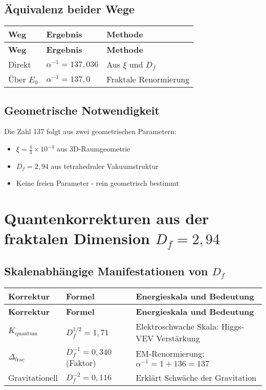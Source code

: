 \documentclass[12pt,a4paper]{article}
\begin{document}
	\subsection{Äquivalenz beider Wege}
	
	\begin{longtable}{|p{3cm}|p{3cm}|p{5cm}|}
		\hline
		\textbf{Weg} & \textbf{Ergebnis} & \textbf{Methode} \\
		\hline
		\endfirsthead
		\hline
		\textbf{Weg} & \textbf{Ergebnis} & \textbf{Methode} \\
		\hline
		\endhead
		Direkt & \(\alpha^{-1} = 137{,}036\) & Aus \(\xi\) und \(D_f\) \\
		\hline
		Über \(E_0\) & \(\alpha^{-1} = 137{,}0\) & Fraktale Renormierung \\
		\hline
	\end{longtable}
	
	\subsection{Geometrische Notwendigkeit}
	
	Die Zahl 137 folgt aus zwei geometrischen Parametern:
	\begin{itemize}
		\item \(\xi = \frac{4}{3} \times 10^{-4}\) aus 3D-Raumgeometrie
		\item \(D_f = 2{,}94\) aus tetrahedraler Vakuumstruktur
		\item Keine freien Parameter - rein geometrisch bestimmt
	\end{itemize}
	
	\section{Quantenkorrekturen aus der fraktalen Dimension \(D_f = 2{,}94\)}
	
	\subsection{Skalenabhängige Manifestationen von \(D_f\)}
	
	\begin{longtable}{|p{4cm}|p{3cm}|p{6cm}|}
		\hline
		\textbf{Korrektur} & \textbf{Formel} & \textbf{Energieskala und Bedeutung} \\
		\hline
		\endfirsthead
		\hline
		\textbf{Korrektur} & \textbf{Formel} & \textbf{Energieskala und Bedeutung} \\
		\hline
		\endhead
		\(K_{\text{quantum}}\) & \(D_f^{1/2} = 1{,}71\) & Elektroschwache Skala: Higgs-VEV Verstärkung \\
		\hline
		\(\Delta_{\text{frac}}\) & \(D_f^{-1} = 0{,}340\) (Faktor) & EM-Renormierung: \(\alpha^{-1} = 1 + 136 = 137\) \\
		\hline
		Gravitationell & \(D_f^{-2} = 0{,}116\) & Erklärt Schwäche der Gravitation \\
		\hline
	\end{longtable}
	
\end{document}
